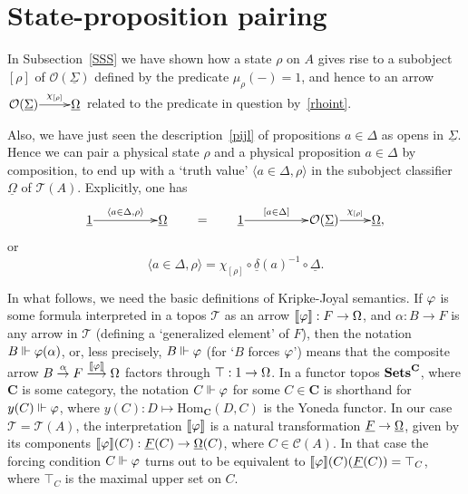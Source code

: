 \documentclass[12pt]{article}
\newcommand{\beq}{\begin{equation}}
\newcommand{\eeq}{\end{equation}}
\newcommand{\Sets}{\mbox{\textbf{Sets}}}
\newcommand{\raw}{\rightarrow} \newcommand{\rat}{\mapsto}
\newcommand{\inv}{^{-1}}
\newcommand{\er}{\eqref}
\newcommand{\al}{\alpha} \newcommand{\bt}{\beta}
\newcommand{\dl}{\delta} \newcommand{\Dl}{\Delta}
\newcommand{\rh}{\rho} \newcommand{\sg}{\sigma}
\newcommand{\ch}{\chi} \newcommand{\ps}{\psi} \newcommand{\Ps}{\Psi}
\newcommand{\CA}{{\mathcal A}} \newcommand{\CB}{{\mathcal B}}
\newcommand{\CO}{{\mathcal O}} \newcommand{\CP}{{\mathcal P}}
\newcommand{\CT}{{\mathcal T}} \newcommand{\CV}{{\mathcal V}}
\newcommand{\alg}[1]{\ensuremath{#1}}
\newcommand{\functor}[1]{\ensuremath{\underline{#1}}}
\newcommand{\context}{\ensuremath{\mathcal{C}}}
\newcommand{\asstopos}{\ensuremath{\mathcal{T}}}
\newcommand{\interpretation}[1]{\ensuremath{\llbracket{#1}\rrbracket}}
\renewcommand{\CA}{\mathcal{C}(A)}
\newcommand{\TA}{\mathcal{T}(A)}
\newcommand{\ulS}{\functor{\Sigma}}
\renewcommand{\TA}{\asstopos(\alg{A})}
\renewcommand{\CA}{\context(\alg{A})}
\begin{document}
\section{State-proposition pairing}\label{Spp}

In Subsection~\ref{SSS} we have shown how a state $\rh$ on $A$ gives
rise to a subobject $[\rh]$ of $\CO(\ulS)$ defined by the predicate
$\mu_{\rho}(-)=1$, and hence to an arrow $\xymatrix@1{\CO(\ulS)
\ar^-{\ch_{[\rh]}}[r] & \functor{\Omega}}$ related to the predicate in
question by~\er{rhoint}.

Also, we have just seen the description~\er{pijl} of propositions
$a\in\Dl$ as opens in $\ulS$. Hence we can pair a physical state
$\rho$ and a physical proposition $a \in \Delta$ by composition, to
end up with a `truth value' $\langle a \in \Delta, \rho \rangle$  in
the subobject classifier $\functor{\Omega}$ of $\TA$. Explicitly, one
has
\beq
  \xymatrix@1{\underline{1} \ar^-{\langle a \in \Delta, \rho
  \rangle}[rr] && \functor{\Omega}}
  \qquad = \qquad
  \xymatrix@1{\underline{1} \ar^-{[a \in \Delta]}[rr] && \CO(\ulS)
  \ar^-{\ch_{[\rh]}}[r] & \functor{\Omega},}
  \label{eq:pairing}
\eeq
 or
 \beq \langle a \in \Delta, \rho \rangle=\ch_{[\rh]}\circ \underline{\dl}(a)\inv\circ\underline{\Delta}.\eeq

In what follows, we need the basic definitions of  Kripke-Joyal semantics. If $\varphi$ is some formula
interpreted in a  topos $\CT$ as an arrow $\interpretation{\phv}:F\raw\Om$, and $\al:B\raw F$ is any arrow in $\CT$ (defining a `generalized element' of $F$), then the notation  $B\Vdash\phv(\al)$, or, less precisely,  $B\Vdash\varphi$ (for `$B$ forces $\varphi$') means that the composite arrow
$B \stackrel{\al}{\raw} F\stackrel{\interpretation{\phv}}{\longrightarrow} \Om$ factors through
$\top:1\raw\Om$. In a functor topos $\Sets^{\mathbf{C}}$, where $\mathbf{C}$ is some category, the notation $C\Vdash \varphi$ for some $C\in\mathbf{C}$ is shorthand for
$y(C)\Vdash \varphi$, where $y(C):D\mapsto \mathrm{Hom}_{\mathbf{C}}(D,C)$ is the Yoneda functor. In our case $\CT=\TA$, the interpretation $\interpretation{\phv}$ is
a natural transformation $\underline{F}\raw\underline{\Om}$,
given by its components $\interpretation{\phv}(C): \underline{F}(C)\raw
\underline{\Om}(C)$, where $C\in\CA$. In that case the forcing condition
$C\Vdash \varphi$ turns out to be
equivalent to  $\interpretation{\phv}(C)(\underline{F}(C))=\top_C$, where $\top_C$ is the maximal upper set on $C$.
\end{document}
